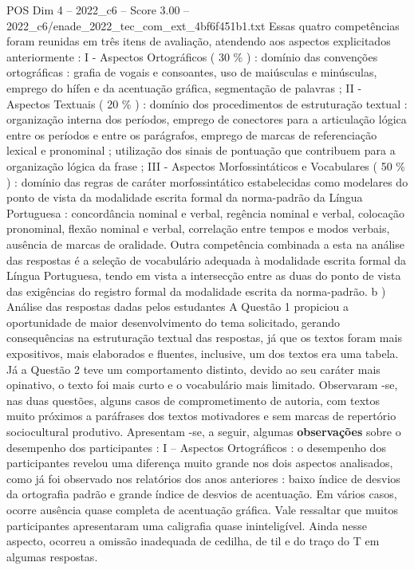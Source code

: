 \begin{textsample}{POS Dim 4 – 2022\_c6 – Score 3.00 – 2022\_c6/enade\_2022\_tec\_com\_ext\_4bf6f451b1.txt}
Essas quatro competências foram reunidas em três itens de avaliação, atendendo aos aspectos explicitados anteriormente : I - Aspectos Ortográficos ( 30 \% ) : domínio das convenções ortográficas : grafia de vogais e consoantes, uso de maiúsculas e minúsculas, emprego do hífen e da acentuação gráfica, segmentação de palavras ; II - Aspectos Textuais ( 20 \% ) : domínio dos procedimentos de estruturação textual : organização interna dos períodos, emprego de conectores para a articulação lógica entre os períodos e entre os parágrafos, emprego de marcas de referenciação lexical e pronominal ; utilização dos sinais de pontuação que contribuem para a organização lógica da frase ; III - Aspectos Morfossintáticos e Vocabulares ( 50 \% ) : domínio das regras de caráter morfossintático estabelecidas como modelares do ponto de vista da modalidade escrita formal da norma-padrão da Língua Portuguesa : concordância nominal e verbal, regência nominal e verbal, colocação pronominal, flexão nominal e verbal, correlação entre tempos e modos verbais, ausência de marcas de oralidade.
Outra competência combinada a esta na análise das respostas é a seleção de vocabulário adequada à modalidade escrita formal da Língua Portuguesa, tendo em vista a intersecção entre as duas do ponto de vista das exigências do registro formal da modalidade escrita da norma-padrão. b ) Análise das respostas dadas pelos estudantes A Questão 1 propiciou a oportunidade de maior desenvolvimento do tema solicitado, gerando consequências na estruturação textual das respostas, já que os textos foram mais expositivos, mais elaborados e fluentes, inclusive, um dos textos era uma tabela.
Já a Questão 2 teve um comportamento distinto, devido ao seu caráter mais opinativo, o texto foi mais curto e o vocabulário mais limitado.
Observaram -se, nas duas questões, alguns casos de comprometimento de autoria, com textos muito próximos a paráfrases dos textos motivadores e sem marcas de repertório sociocultural produtivo.
Apresentam -se, a seguir, algumas \textbf{observações} sobre o desempenho dos participantes : I – Aspectos Ortográficos : o desempenho dos participantes revelou uma diferença muito grande nos dois aspectos analisados, como já foi observado nos relatórios dos anos anteriores : baixo índice de desvios da ortografia padrão e grande índice de desvios de acentuação.
Em vários casos, ocorre ausência quase completa de acentuação gráfica.
Vale ressaltar que muitos participantes apresentaram uma caligrafia quase ininteligível.
Ainda nesse aspecto, ocorreu a omissão inadequada de cedilha, de til e do traço do T em algumas respostas.

\end{textsample}
